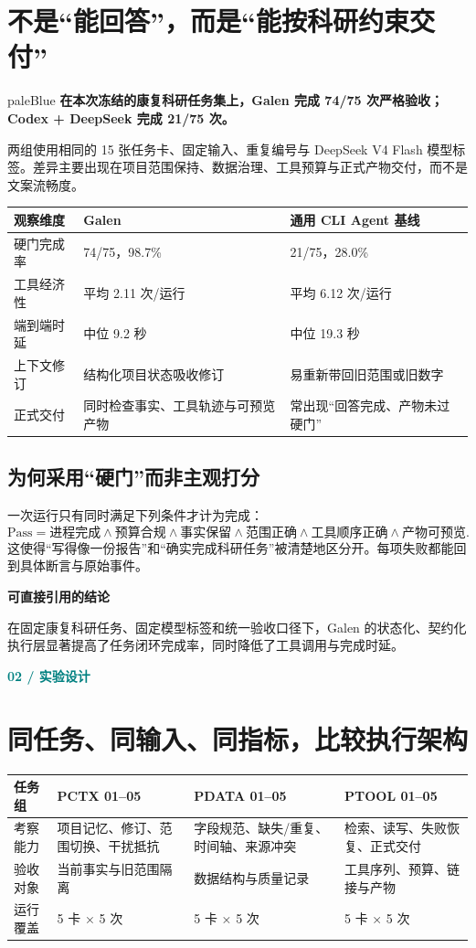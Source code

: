 \documentclass[UTF8,11pt,a4paper]{ctexart}
\newcommand{\kicker}[1]{\textcolor{teal}{\sffamily\bfseries\small #1}\par\vspace{1mm}}
\begin{document}
\section*{不是“能回答”，而是“能按科研约束交付”}
\begin{card}{paleBlue}
\textbf{在本次冻结的康复科研任务集上，Galen 完成 74/75 次严格验收；Codex + DeepSeek 完成 21/75 次。}\par
两组使用相同的 15 张任务卡、固定输入、重复编号与 DeepSeek V4 Flash 模型标签。差异主要出现在项目范围保持、数据治理、工具预算与正式产物交付，而不是文案流畅度。
\end{card}
\begin{tabularx}{\textwidth}{@{}p{34mm}Y Y@{}}
\toprule
\textbf{观察维度} & \textbf{Galen} & \textbf{通用 CLI Agent 基线}\\
\midrule
硬门完成率 & 74/75，98.7\% & 21/75，28.0\%\\
工具经济性 & 平均 2.11 次/运行 & 平均 6.12 次/运行\\
端到端时延 & 中位 9.2 秒 & 中位 19.3 秒\\
上下文修订 & 结构化项目状态吸收修订 & 易重新带回旧范围或旧数字\\
正式交付 & 同时检查事实、工具轨迹与可预览产物 & 常出现“回答完成、产物未过硬门”\\
\bottomrule
\end{tabularx}
\subsection*{为何采用“硬门”而非主观打分}
一次运行只有同时满足下列条件才计为完成：
\[
\text{Pass}=\text{进程完成}\land\text{预算合规}\land\text{事实保留}\land\text{范围正确}\land\text{工具顺序正确}\land\text{产物可预览}.
\]
这使得“写得像一份报告”和“确实完成科研任务”被清楚地区分开。每项失败都能回到具体断言与原始事件。
\begin{darkbox}
\textbf{可直接引用的结论}\par
在固定康复科研任务、固定模型标签和统一验收口径下，Galen 的状态化、契约化执行层显著提高了任务闭环完成率，同时降低了工具调用与完成时延。
\end{darkbox}
\clearpage

\kicker{02  /  实验设计}
\section*{同任务、同输入、同指标，比较执行架构}
\begin{tabularx}{\textwidth}{@{}p{31mm}Y Y Y@{}}
\toprule
\textbf{任务组} & \textbf{PCTX 01--05} & \textbf{PDATA 01--05} & \textbf{PTOOL 01--05}\\
\midrule
考察能力 & 项目记忆、修订、范围切换、干扰抵抗 & 字段规范、缺失/重复、时间轴、来源冲突 & 检索、读写、失败恢复、正式交付\\
验收对象 & 当前事实与旧范围隔离 & 数据结构与质量记录 & 工具序列、预算、链接与产物\\
运行覆盖 & 5 卡 × 5 次 & 5 卡 × 5 次 & 5 卡 × 5 次\\
\bottomrule
\end{tabularx}
\end{document}
